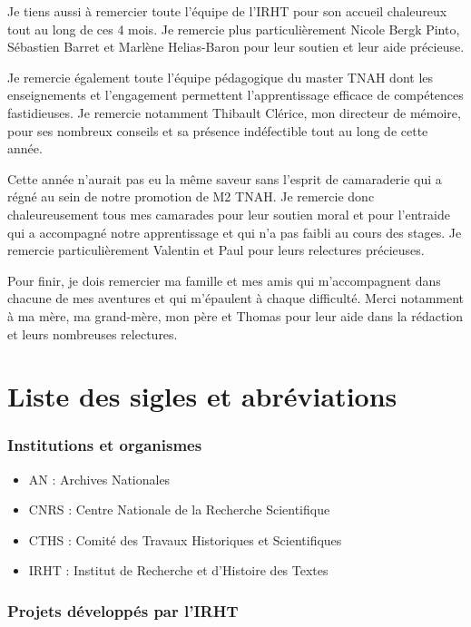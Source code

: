 \documentclass[a4paper,12pt,twoside]{book}
\begin{document}
	Je tiens aussi à remercier toute l'équipe de l'IRHT pour son accueil chaleureux tout au long de ces 4 mois. Je remercie plus particulièrement Nicole Bergk Pinto, Sébastien Barret et Marlène Helias-Baron pour leur soutien et leur aide précieuse.
	
	Je remercie également toute l'équipe pédagogique du master TNAH dont les enseignements et l'engagement permettent l'apprentissage efficace de compétences fastidieuses. Je remercie notamment Thibault Clérice, mon directeur de mémoire, pour ses nombreux conseils et sa présence indéfectible tout au long de cette année.
	
	Cette année n'aurait pas eu la même saveur sans l'esprit de camaraderie qui a régné au sein de notre promotion de M2 TNAH. Je remercie donc chaleureusement tous mes camarades pour leur soutien moral et pour l'entraide qui a accompagné notre apprentissage et qui n'a pas faibli au cours des stages. Je remercie particulièrement Valentin et Paul pour leurs relectures précieuses.
	
	Pour finir, je dois remercier ma famille et mes amis qui m'accompagnent dans chacune de mes aventures et qui m'épaulent à chaque difficulté. Merci notamment à ma mère, ma grand-mère, mon père et Thomas pour leur aide dans la rédaction et leurs nombreuses relectures.
	
	\chapter{Liste des sigles et abréviations}
	
	\subsection*{Institutions et organismes}
	
	\begin{itemize}
		\item AN : Archives Nationales
		\item CNRS : Centre Nationale de la Recherche Scientifique
		\item CTHS : Comité des Travaux Historiques et Scientifiques
		\item IRHT : Institut de Recherche et d'Histoire des Textes
	\end{itemize}

	\subsection*{Projets développés par l'IRHT}
	
\end{document}
